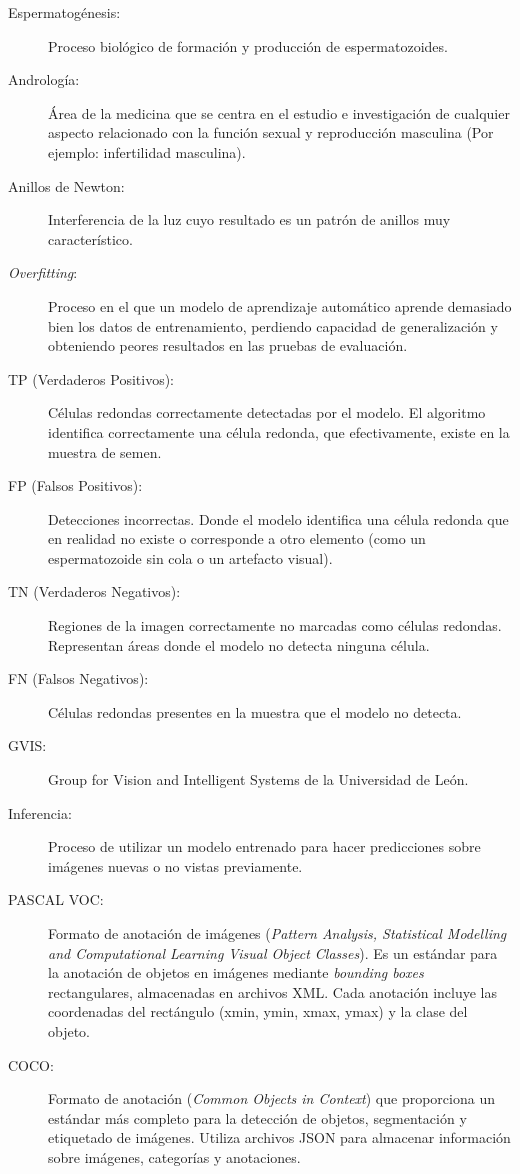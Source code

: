 \documentclass[12pt,a4paper,onecolumn,oneside]{report}
\begin{document}
\begin{description}
  \item[Espermatogénesis:] Proceso biológico de formación y producción de espermatozoides.
  \item[Andrología:] Área de la medicina que se centra en el estudio e investigación de cualquier aspecto relacionado con la función sexual y reproducción masculina (Por ejemplo: infertilidad masculina).  
  \item[Anillos de Newton:] Interferencia de la luz cuyo resultado es un patrón de anillos muy característico.
  \item[\textit{Overfitting}:] Proceso en el que un modelo de aprendizaje automático aprende demasiado bien los datos de entrenamiento, perdiendo capacidad de generalización y obteniendo peores resultados en las pruebas de evaluación.
  \item[TP (Verdaderos Positivos):] Células redondas correctamente detectadas por el modelo. El algoritmo identifica correctamente una célula redonda, que efectivamente, existe en la muestra de semen.
  \item[FP (Falsos Positivos):] Detecciones incorrectas. Donde el modelo identifica una célula redonda que en realidad no existe o corresponde a otro elemento (como un espermatozoide sin cola o un artefacto visual).
  \item[TN (Verdaderos Negativos):] Regiones de la imagen correctamente no marcadas como células redondas. Representan áreas donde el modelo no detecta ninguna célula.
  \item[FN (Falsos Negativos):] Células redondas presentes en la muestra que el modelo no detecta.
  \item[GVIS:] Group for Vision and Intelligent Systems de la Universidad de León.  
  \item[Inferencia:] Proceso de utilizar un modelo entrenado para hacer predicciones sobre imágenes nuevas o no vistas previamente.
  \item[PASCAL VOC:] Formato de anotación de imágenes (\textit{Pattern Analysis, Statistical Modelling and Computational Learning Visual Object Classes}). 
  Es un estándar para la anotación de objetos en imágenes mediante \textit{bounding boxes} rectangulares, almacenadas en archivos XML. Cada anotación incluye las coordenadas del 
  rectángulo (xmin, ymin, xmax, ymax) y la clase del objeto.
  \item[COCO:] Formato de anotación (\textit{Common Objects in Context}) que proporciona un estándar más completo para la detección de objetos, segmentación y etiquetado de imágenes. Utiliza archivos JSON para 
  almacenar información sobre imágenes, categorías y anotaciones.
\end{description} 
\end{document}
